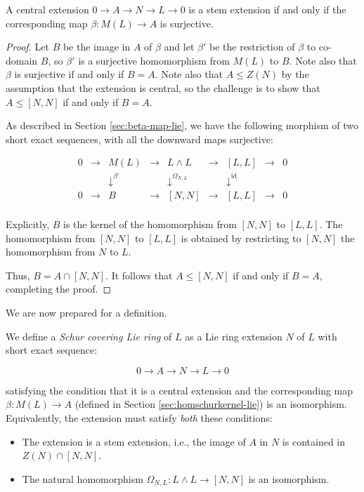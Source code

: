 \begin{lemma}\label{lemma:stem-beta-surjective-lie}
  A central extension $0 \to A \to N \to L \to 0$ is a stem extension
  if and only if the corresponding map $\beta: M(L) \to A$ is
  surjective.
\end{lemma}

\begin{proof}
  Let $B$ be the image in $A$ of $\beta$ and let $\beta'$ be the
  restriction of $\beta$ to co-domain $B$, so $\beta'$ is a surjective
  homomorphism from $M(L)$ to $B$. Note also that $\beta$ is
  surjective if and only if $B = A$. Note also that $A \le Z(N)$ by
  the assumption that the extension is central, so the challenge is to
  show that $A \le [N,N]$ if and only if $B = A$.

  As described in Section \ref{sec:beta-map-lie}, we have the following
  morphism of two short exact sequences, with all the downward maps
  surjective:

  $$\begin{array}{ccccccccc}
    0 & \to & M(L) & \to & L \wedge L & \to & [L,L] & \to & 0\\
    &&   \downarrow^{\beta'}  &&  \downarrow^{\Omega_{N,L}}     && \downarrow^{\text{id}} && \\
    0 & \to & B &\to & [N,N] & \to & [L,L] & \to & 0\\
  \end{array}$$

  Explicitly, $B$ is the kernel of the homomorphism from $[N,N]$ to
  $[L,L]$. The homomorphism from $[N,N]$ to $[L,L]$ is obtained by
  restricting to $[N,N]$ the homomorphism from $N$ to $L$. 

  Thus, $B = A \cap [N,N]$. It follows that $A \le [N,N]$ if and only
  if $B = A$, completing the proof.
\end{proof}

We are now prepared for a definition.

\begin{definer}
  We define a {\em Schur covering Lie ring} of $L$ as a Lie ring
  extension $N$ of $L$ with short exact sequence:

  $$0 \to A \to N \to L \to 0$$
  
  satisfying the condition that it is a central extension and the
  corresponding map $\beta: M(L) \to A$ (defined in Section
  \ref{sec:homschurkernel-lie}) is an isomorphism. Equivalently, the
  extension must satisfy {\em both} these conditions:
  
  \begin{itemize}
  \item The extension is a stem extension, i.e., the image of $A$ in $N$
    is contained in $Z(N) \cap [N,N]$.
  \item The natural homomorphism $\Omega_{N,L}: L \wedge L \to [N,N]$ is an
    isomorphism.
  \end{itemize}
\end{definer}
  
